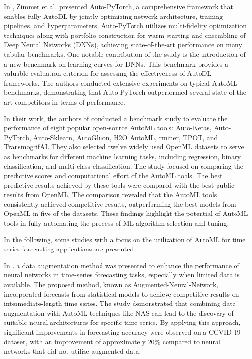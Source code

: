 In \cite{Zimmer2020}, Zimmer et al. presented Auto-PyTorch, a comprehensive framework that enables fully AutoDL by jointly optimizing network architecture, training pipelines, and hyperparameters.
Auto-PyTorch utilizes multi-fidelity optimization techniques along with portfolio construction for warm starting and ensembling of Deep Neural Networks (DNNs), achieving state-of-the-art performance on many tabular benchmarks.
One notable contribution of the study is the introduction of a new benchmark on learning curves for DNNs.
This benchmark provides a valuable evaluation criterion for assessing the effectiveness of AutoDL frameworks.
The authors conducted extensive experiments on typical AutoML benchmarks, demonstrating that Auto-PyTorch outperformed several state-of-the-art competitors in terms of performance.

In their work, the authors of \cite{9534091} conducted a benchmark study to evaluate the performance of eight popular open-source AutoML tools: Auto-Keras, Auto-PyTorch, Auto-Sklearn, AutoGluon, H2O AutoML, rminer, TPOT, and TransmogrifAI.
They also selected twelve widely used OpenML datasets to serve as benchmarks for different machine learning tasks, including regression, binary classification, and multi-class classification.
The study focused on comparing the predictive scores and computational effort of the AutoML tools.
The best predictive results achieved by these tools were compared with the best public results from OpenML.
The comparison revealed that the AutoML tools consistently achieved competitive results, outperforming the best models from OpenML in five of the datasets.
These findings highlight the potential of AutoML tools in fully automating the process of ML algorithm selection and tuning.

In the following, some studies with a focus on the utilization of AutoML for time series forecasting applications are presented.

In \cite{9564380}, a data augmentation method was presented to enhance the performance of neural networks in time-series forecasting tasks, especially when limited data is available. 
The proposed method, known as Augmented-Neural-Network, incorporated forecasts from statistical models to achieve competitive results on intermediate-length time series.
The study demonstrated that combining data augmentation with AutoML techniques like NAS can lead to the discovery of suitable neural architectures for specific time series.
By applying this approach, significant improvements in forecasting accuracy were observed on a COVID-19 dataset, with an improvement of approximately 20\% compared to neural networks that did not utilize augmented data.

